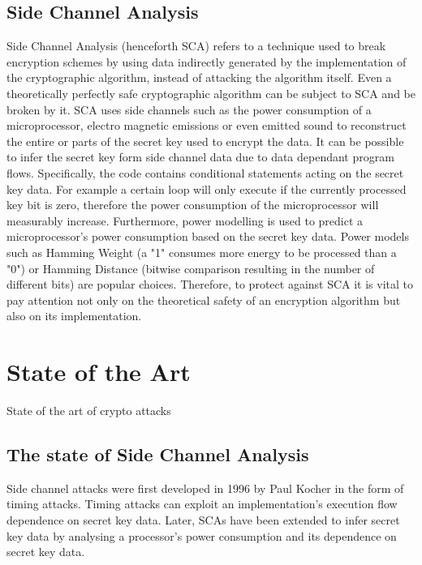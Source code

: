 \documentclass[journal]{IEEEtran}
\begin{document}
\subsection{Side Channel Analysis}
Side Channel Analysis (henceforth SCA) refers to a technique used to break encryption schemes by using data indirectly generated by the implementation of the cryptographic algorithm, instead of attacking the algorithm itself. Even a theoretically perfectly safe cryptographic algorithm can be subject to SCA and be broken by it. SCA uses side channels such as the power consumption of a microprocessor, electro magnetic emissions or even emitted sound to reconstruct the entire or parts of the secret key used to encrypt the data. It can be possible to infer the secret key form side channel data due to data dependant program flows. Specifically, the code contains conditional statements acting on the secret key data. For example a certain loop will only execute if the currently processed key bit is zero, therefore the power consumption of the microprocessor will measurably increase. Furthermore, power modelling is used to predict a microprocessor's power consumption based on the secret key data. Power models such as Hamming Weight (a "1" consumes more energy to be processed than a "0") or Hamming Distance (bitwise comparison resulting in the number of different bits) are popular choices. Therefore, to protect against SCA it is vital to pay attention not only on the theoretical safety of an encryption algorithm but also on its implementation.

\section{State of the Art}
State of the art of crypto attacks

\subsection{The state of Side Channel Analysis}
Side channel attacks were first developed in 1996 by Paul Kocher \cite{first-sca:kocher} in the form of timing attacks. Timing attacks can exploit an implementation's execution flow dependence on secret key data. Later, SCAs have been extended to infer secret key data by analysing a processor's power consumption and its dependence on secret key data. 
\end{document}
